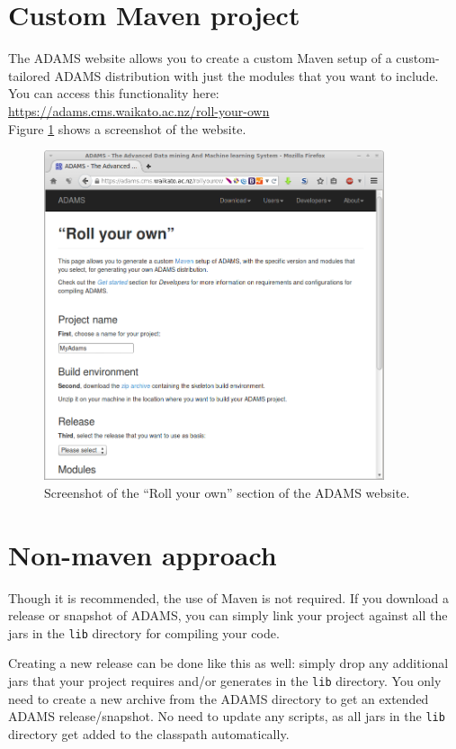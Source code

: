\section{Custom Maven project}
The ADAMS website allows you to create a custom Maven setup of a 
custom-tailored ADAMS distribution with just the modules that you want to 
include. You can access this functionality here: \\
  \url{https://adams.cms.waikato.ac.nz/roll-your-own}{} \\
Figure \ref{rollyourown} shows a screenshot of the website.

\begin{figure}[htb]
  \centering
  \includegraphics[width=10.0cm]{images/rollyourown.png}
  \caption{Screenshot of the ``Roll your own'' section of the ADAMS website.}
  \label{rollyourown}
\end{figure}

\section{Non-maven approach}
Though it is recommended, the use of Maven is not required. If you download
a release or snapshot of ADAMS, you can simply link your project against all
the jars in the \texttt{lib} directory for compiling your code.

Creating a new release can be done like this as well: simply drop any 
additional jars that your project requires and/or generates in the \texttt{lib}
directory. You only need to create a new archive from the ADAMS directory to
get an extended ADAMS release/snapshot. No need to update any scripts, as all
jars in the \texttt{lib} directory get added to the classpath automatically.


